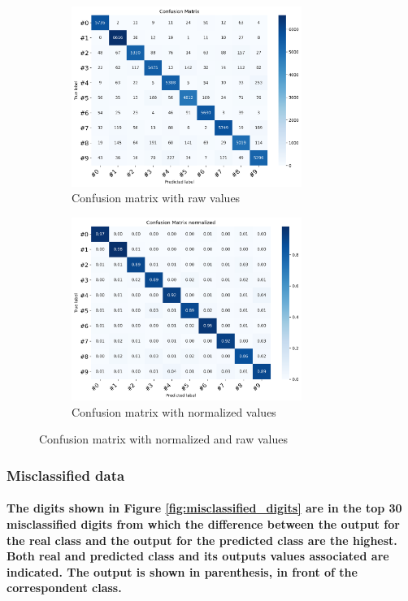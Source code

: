 \documentclass[a4paper]{article}    %
\begin{document}
\begin{figure}[H]
    \centering
    \begin{subfigure}{0.48\textwidth}
        \centering
        \includegraphics[width=7.5cm]{cm_raw}
        \caption{Confusion matrix with raw values}
        \label{fig:cm_raw}
    \end{subfigure}
    \hfill
    \begin{subfigure}{0.48\textwidth}
        \centering
        \includegraphics[width=7.5cm]{cm_norm}
        \caption{Confusion matrix with normalized values}
        \label{fig:cm_norm}
    \end{subfigure}
    \hfill
    \caption{Confusion matrix with normalized and raw values} 
    \label{fig:cm}
\end{figure}

\subsubsection{Misclassified data}

\paragraph{The digits shown in Figure \ref{fig:misclassified_digits} are in the top 30 misclassified digits from which the difference between the output for the real class and the output for the predicted class are the highest. Both real and predicted class and its outputs values associated are indicated. The output is shown in parenthesis, in front of the correspondent class.}
\end{document}
